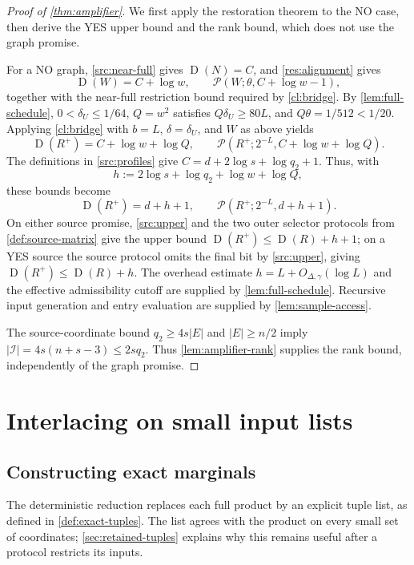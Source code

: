 \documentclass[11pt]{article} \usepackage[utf8]{inputenc}
\theoremstyle{plain} \newtheorem{theorem}{Theorem}[section]
\theoremstyle{definition} \newaliascnt{definition}{theorem}
\newcommand{\D}{\operatorname{D}}
\newcommand{\RP}[3]{\mathcal{P}(#1;#2,#3)}
\begin{document}
\begin{proof}[Proof of \cref{thm:amplifier}]
We first apply the restoration theorem to the NO case, then derive the YES upper
bound and the rank bound, which does not use the graph promise.

For a NO graph, \cref{src:near-full} gives \(\D(N)=C\), and \cref{res:alignment}
gives
\[
\D(W)=C+\log w,\qquad \RP{W}{\theta}{C+\log w-1},
\]
together with the near-full restriction bound required by \cref{cl:bridge}. By
\cref{lem:full-schedule}, \(0<\delta_U\le1/64\), \(Q=w^2\) satisfies \(Q\delta_U\ge80L\), and
\(Q\theta=1/512<1/20\). Applying \cref{cl:bridge}
with \(b=L\), \(\delta=\delta_U\), and \(W\) as above yields
\[
\D(R^+)=C+\log w+\log Q,\qquad \RP{R^+}{2^{-L}}{C+\log w+\log Q}.
\]
The definitions in \cref{src:profiles} give \(C=d+2\log s+\log q_2+1\). Thus,
with
\[
h:=2\log s+\log q_2+\log w+\log Q,
\]
these bounds become
\[
\D(R^+)=d+h+1,\qquad \RP{R^+}{2^{-L}}{d+h+1}.
\]
On either source promise, \cref{src:upper} and the two outer selector protocols
from \cref{def:source-matrix} give the upper bound \(\D(R^+)\le\D(R)+h+1\); on a
YES source the source protocol omits the final bit by \cref{src:upper}, giving
\(\D(R^+)\le\D(R)+h\). The overhead estimate \(h=L+O_{\Delta,\gamma}(\log L)\)
and the effective admissibility cutoff are supplied by \cref{lem:full-schedule}.
Recursive input generation and entry evaluation are supplied by
\cref{lem:sample-access}.

The source-coordinate bound $q_2\ge4s|E|$ and $|E|\ge n/2$ imply
$|\mathcal I|=4s(n+s-3)\le2sq_2$.
Thus \cref{lem:amplifier-rank} supplies the rank bound, independently of the
graph promise.
\end{proof}


\section{Interlacing on small input lists}
\label{sec:small-lists}
\subsection{Constructing exact marginals}

The deterministic reduction replaces each full product by an explicit tuple
list, as defined in \cref{def:exact-tuples}. The list agrees with the product
on every small set of coordinates; \cref{sec:retained-tuples} explains why
this remains useful after a protocol restricts its inputs.
\end{document}

